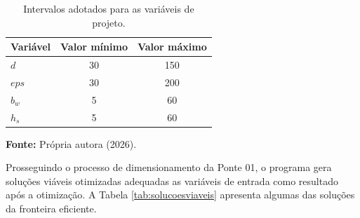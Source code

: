 \begin{table}[htpb!]
    \centering
    \caption{Intervalos adotados para as variáveis de projeto.}
    \label{tab:intervalos_variaveis}

    \fontsize{11pt}{13.2pt}\selectfont
    \begin{tabular}{lcc}
        \toprule
        \textbf{Variável} & \textbf{Valor mínimo} & \textbf{Valor máximo} \\ \midrule
        $d$     & 30 & 150 \\
        $eps$ & 30 & 200 \\
        $b_w$     & 5  & 60  \\
        $h_s$     & 5  & 60  \\ \bottomrule
    \end{tabular}

    \vspace{0.1cm}
    \par {\fontsize{11pt}{13.2pt}\selectfont \textbf{Fonte:} Própria autora (2026).}
\end{table}


Prosseguindo o processo de dimensionamento da Ponte 01, o programa gera soluções viáveis otimizadas adequadas as variáveis de entrada como resultado após a otimização. A Tabela \ref{tab:solucoesviaveis} apresenta algumas das soluções da fronteira eficiente.

